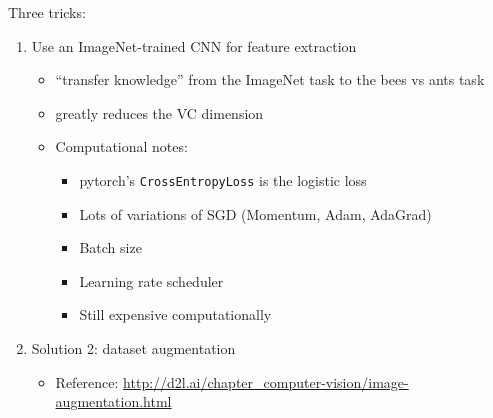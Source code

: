 \documentclass[10pt]{exam}
\theoremstyle{definition}
\newcommand{\Ein}{E_{\text{in}}}
\newcommand{\Eout}{E_{\text{out}}}
\begin{document}
Three tricks:
\begin{enumerate}
    \item Use an ImageNet-trained CNN for feature extraction

        \begin{itemize}
            \item ``transfer knowledge'' from the ImageNet task to the bees vs ants task
                \vspace{1in}

            \item greatly reduces the VC dimension

                \vspace{3in}



            \item Computational notes:
                

                \begin{itemize}
                    \item pytorch's \lstinline{CrossEntropyLoss} is the logistic loss
                    \item Lots of variations of SGD (Momentum, Adam, AdaGrad)
                    \item Batch size
                    \item Learning rate scheduler
                    \item Still expensive computationally
                \end{itemize}
        \end{itemize}

        \newpage
\item
Solution 2: dataset augmentation

        \begin{itemize}
            \item Reference: \url{http://d2l.ai/chapter_computer-vision/image-augmentation.html}


\end{itemize}
\end{enumerate}
\end{document}
